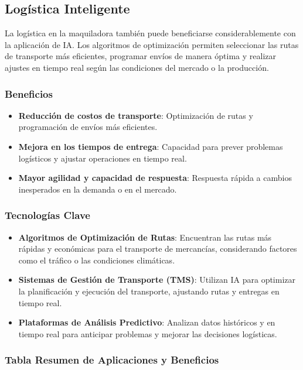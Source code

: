 \subsection{Logística Inteligente}

La logística en la maquiladora también puede beneficiarse considerablemente con la aplicación de IA. Los algoritmos de optimización permiten seleccionar las rutas de transporte más eficientes, programar envíos de manera óptima y realizar ajustes en tiempo real según las condiciones del mercado o la producción.

\subsubsection{Beneficios}

\begin{itemize}
    \item \textbf{Reducción de costos de transporte}: Optimización de rutas y programación de envíos más eficientes.
    \item \textbf{Mejora en los tiempos de entrega}: Capacidad para prever problemas logísticos y ajustar operaciones en tiempo real.
    \item \textbf{Mayor agilidad y capacidad de respuesta}: Respuesta rápida a cambios inesperados en la demanda o en el mercado.
\end{itemize}

\subsubsection{Tecnologías Clave}

\begin{itemize}
    \item \textbf{Algoritmos de Optimización de Rutas}: Encuentran las rutas más rápidas y económicas para el transporte de mercancías, considerando factores como el tráfico o las condiciones climáticas.
    \item \textbf{Sistemas de Gestión de Transporte (TMS)}: Utilizan IA para optimizar la planificación y ejecución del transporte, ajustando rutas y entregas en tiempo real.
    \item \textbf{Plataformas de Análisis Predictivo}: Analizan datos históricos y en tiempo real para anticipar problemas y mejorar las decisiones logísticas.
\end{itemize}

\subsubsection{Tabla Resumen de Aplicaciones y Beneficios}

